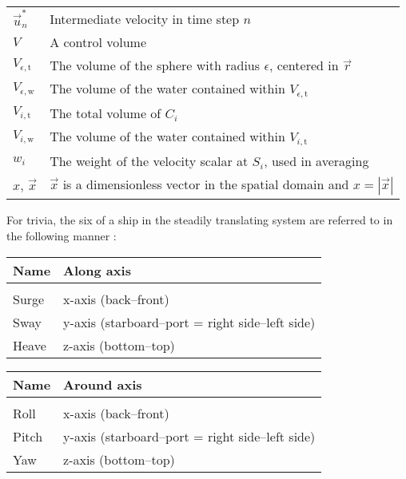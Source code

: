 {\begin{center}
\begin{longtabu}{l X}
    $\vec{u}^*_n$       & Intermediate velocity in time step $n$ \\
    $V$                 & A control volume \\
    $V_{\epsilon,\text{t}}$     & The volume of the sphere with radius $\epsilon$,
                                  centered in $\vec{r}$ \\
    $V_{\epsilon,\text{w}}$     & The volume of the water contained within $V_{\epsilon,\text{t}}$ \\
    $V_{i,\text{t}}$    & The total volume of $C_i$ \\
    $V_{i,\text{w}}$    & The volume of the water contained within $V_{i,\text{t}}$ \\
    $w_i$               & The weight of the velocity scalar at $S_i$, used in averaging \\
    $x,\,\vec{x}$       & $\vec{x}$ is a dimensionless vector in the spatial domain
                          and $x = |\vec{x}|$ \\
\end{longtabu}
\end{center}
}


\begin{center}
\tableoftaa
\end{center}



For trivia, the six \DOF of a ship in the steadily translating system are referred to in the following manner \citep{Journee2001a}:

\clearpage
{}

\begin{longtabu}{l X}
    \textbf{Name} & \textbf{Along axis} \\
    \hline
    \\
    \endhead
    
	Surge & x-axis (back--front) \\
	Sway  & y-axis (starboard--port = right side--left side) \\
	Heave & z-axis (bottom--top) \\
\end{longtabu}


\begin{longtabu}{l X}
    \textbf{Name} & \textbf{Around axis}\\
    \hline
    \\
    \endhead
    
    Roll  & x-axis (back--front) \\
    Pitch & y-axis (starboard--port = right side--left side) \\
    Yaw   & z-axis (bottom--top) \\
\end{longtabu}
